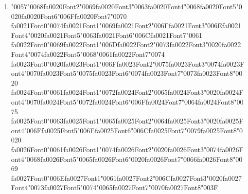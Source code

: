 \documentclass[12pt]{article}
\begin{document}
\begin{enumerate}[label=Q\arabic*.]
 \begin{enumerate}[label=(\Alph*)]
     \item Implicit regularization of weights
     \item Exponentially more expressive representations
     \item Increased ability to model hierarchical structure
     \item A model equivalent to a single linear transformation
 \end{enumerate}
 
 \item {\char"0057}{\char"0068}{\csname fa0020Font2\endcsname\char"0069}{\csname fa0020Font3\endcsname\char"0063}{\csname fa0020Font4\endcsname\char"0068}{\csname fa0020Font5\endcsname\char"0020}{\csname fa0020Font6\endcsname\char"006F}{\csname fa0020Font7\endcsname\char"0070} {\csname fa0021Font0\endcsname\char"0074}{\csname fa0021Font1\endcsname\char"0069}{\csname fa0021Font2\endcsname\char"006F}{\csname fa0021Font3\endcsname\char"006E}{\csname fa0021Font4\endcsname\char"0020}{\csname fa0021Font5\endcsname\char"0063}{\csname fa0021Font6\endcsname\char"006C}{\csname fa0021Font7\endcsname\char"0061} {\csname fa0022Font0\endcsname\char"0069}{\csname fa0022Font1\endcsname\char"006D}{\csname fa0022Font2\endcsname\char"0073}{\csname fa0022Font3\endcsname\char"0020}{\csname fa0022Font4\endcsname\char"0074}{\csname fa0022Font5\endcsname\char"0068}{\char"0061}{\csname fa0022Font7\endcsname\char"0074} {\csname fa0023Font0\endcsname\char"0020}{\csname fa0023Font1\endcsname\char"006F}{\csname fa0023Font2\endcsname\char"0075}{\csname fa0023Font3\endcsname\char"0074}{\csname fa0023Font4\endcsname\char"0070}{\csname fa0023Font5\endcsname\char"0075}{\csname fa0023Font6\endcsname\char"0074}{\csname fa0023Font7\endcsname\char"0073}{\csname fa0023Font8\endcsname\char"0020} {\csname fa0024Font0\endcsname\char"0061}{\csname fa0024Font1\endcsname\char"0072}{\csname fa0024Font2\endcsname\char"0065}{\csname fa0024Font3\endcsname\char"0020}{\csname fa0024Font4\endcsname\char"0070}{\csname fa0024Font5\endcsname\char"0072}{\csname fa0024Font6\endcsname\char"006F}{\csname fa0024Font7\endcsname\char"0064}{\csname fa0024Font8\endcsname\char"0075} {\csname fa0025Font0\endcsname\char"0063}{\csname fa0025Font1\endcsname\char"0065}{\csname fa0025Font2\endcsname\char"0064}{\csname fa0025Font3\endcsname\char"0020}{\csname fa0025Font4\endcsname\char"006F}{\csname fa0025Font5\endcsname\char"006E}{\csname fa0025Font6\endcsname\char"006C}{\csname fa0025Font7\endcsname\char"0079}{\csname fa0025Font8\endcsname\char"0020} {\csname fa0026Font0\endcsname\char"0061}{\csname fa0026Font1\endcsname\char"0074}{\csname fa0026Font2\endcsname\char"0020}{\csname fa0026Font3\endcsname\char"0074}{\csname fa0026Font4\endcsname\char"0068}{\csname fa0026Font5\endcsname\char"0065}{\csname fa0026Font6\endcsname\char"0020}{\csname fa0026Font7\endcsname\char"0066}{\csname fa0026Font8\endcsname\char"0069} {\csname fa0027Font0\endcsname\char"006E}{\csname fa0027Font1\endcsname\char"0061}{\csname fa0027Font2\endcsname\char"006C}{\csname fa0027Font3\endcsname\char"0020}{\csname fa0027Font4\endcsname\char"0073}{\csname fa0027Font5\endcsname\char"0074}{\char"0065}{\csname fa0027Font7\endcsname\char"0070}{\csname fa0027Font8\endcsname\char"003F}

\end{enumerate}
\end{document}
